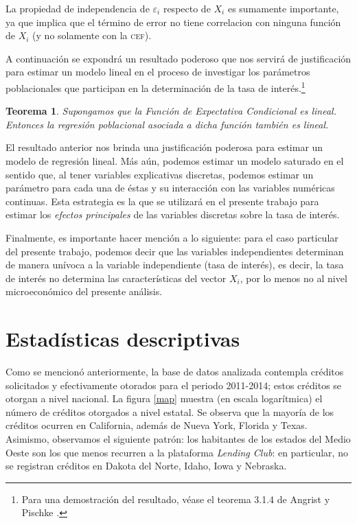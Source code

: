 \documentclass[12pt, fleqn, letterpaper, oneside]{amsart}
\newtheorem{teo}{Teorema}
\begin{document}
La propiedad de independencia de $\varepsilon_i$  respecto de $X_i$ es sumamente importante, ya que implica que el término de error no tiene correlacion con ninguna función de $X_i$ (y no solamente con la \textsc{cef}). 

A continuación se expondrá un resultado poderoso que nos servirá de justificación para estimar un modelo lineal en el proceso de investigar los parámetros poblacionales que participan en la determinación de la tasa de interés.\footnote{Para una demostración del resultado, véase el teorema 3.1.4 de Angrist y Pischke \cite{mostly}.}

\begin{teo}
	Supongamos que la Función de Expectativa Condicional es lineal. Entonces la regresión poblacional asociada a dicha función también es lineal.
\end{teo}

El resultado anterior nos brinda una justificación poderosa para estimar un modelo de regresión lineal. Más aún, podemos estimar un modelo saturado en el sentido que, al tener variables explicativas discretas, podemos estimar un parámetro para cada una de éstas y su interacción con las variables numéricas continuas. Esta estrategia es la que se utilizará en el presente trabajo para estimar los \emph{efectos principales} de las variables discretas sobre la tasa de interés. 

Finalmente, es importante hacer mención a lo siguiente: para el caso particular del presente trabajo, podemos decir que las variables independientes determinan de manera unívoca a la variable independiente (tasa de interés), es decir, la tasa de interés no determina las características del vector $X_i$, por lo menos no al nivel microeconómico del presente análisis. 

\section{Estadísticas descriptivas}

Como se mencionó anteriormente, la base de datos analizada contempla créditos solicitados y efectivamente otorados para el periodo 2011-2014; estos créditos se otorgan a nivel nacional. La figura \ref{map} muestra (en escala logarítmica) el número de créditos otorgados a nivel estatal. Se observa que la mayoría de los créditos ocurren en California, además de Nueva York, Florida y Texas. Asimismo, observamos el siguiente patrón: los habitantes de los estados del Medio Oeste son los que menos recurren a la plataforma \emph{Lending Club}: en particular, no se registran créditos en Dakota del Norte, Idaho, Iowa y Nebraska.  
\end{document}
